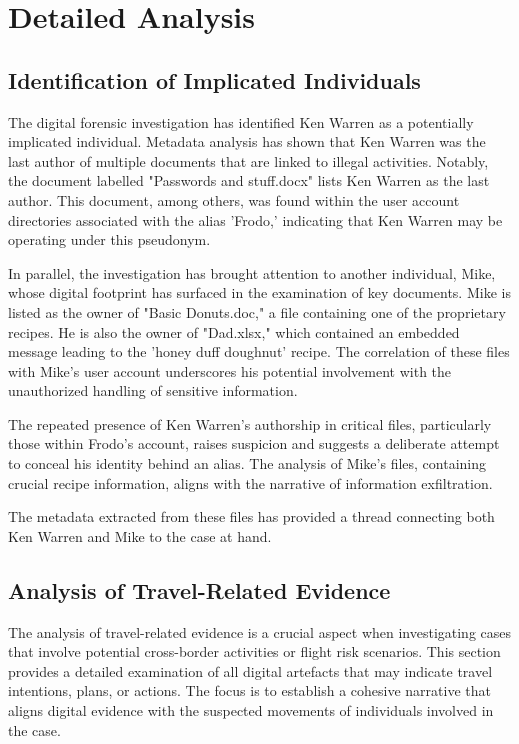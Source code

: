\chapter{Detailed Analysis}

\section{Identification of Implicated Individuals}
The digital forensic investigation has identified Ken Warren as a potentially implicated individual. Metadata analysis has shown that Ken Warren was the last author of multiple documents that are linked to illegal activities. Notably, the document labelled "Passwords and stuff.docx" lists Ken Warren as the last author. This document, among others, was found within the user account directories associated with the alias 'Frodo,' indicating that Ken Warren may be operating under this pseudonym.

In parallel, the investigation has brought attention to another individual, Mike, whose digital footprint has surfaced in the examination of key documents. Mike is listed as the owner of "Basic Donuts.doc," a file containing one of the proprietary recipes. He is also the owner of "Dad.xlsx," which contained an embedded message leading to the 'honey duff doughnut' recipe. The correlation of these files with Mike's user account underscores his potential involvement with the unauthorized handling of sensitive information.

The repeated presence of Ken Warren's authorship in critical files, particularly those within Frodo's account, raises suspicion and suggests a deliberate attempt to conceal his identity behind an alias. The analysis of Mike's files, containing crucial recipe information, aligns with the narrative of information exfiltration.

The metadata extracted from these files has provided a thread connecting both Ken Warren and Mike to the case at hand.

\section{Analysis of Travel-Related Evidence}
The analysis of travel-related evidence is a crucial aspect when investigating cases that involve potential cross-border activities or flight risk scenarios. This section provides a detailed examination of all digital artefacts that may indicate travel intentions, plans, or actions. The focus is to establish a cohesive narrative that aligns digital evidence with the suspected movements of individuals involved in the case.

